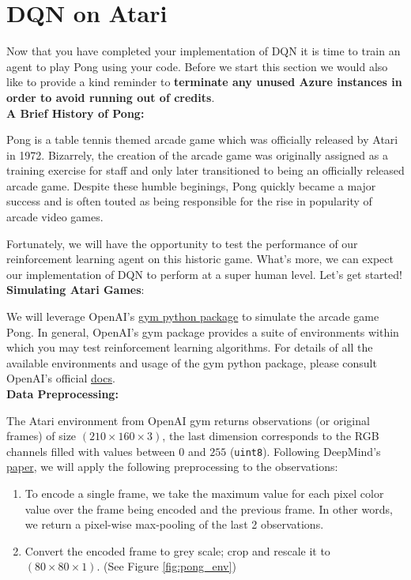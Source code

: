 \section{DQN on Atari}

Now that you have completed your implementation of DQN it is time to train an agent to play Pong using your code. Before we start this section we would also like to provide a kind reminder to \textbf{terminate any unused Azure instances in order to avoid running out of credits}. \\

\textbf{A Brief History of Pong:} 

Pong is a table tennis themed arcade game which was officially released by Atari in 1972. Bizarrely, the creation of the arcade game was originally assigned as a training exercise for staff and only later transitioned to being an officially released arcade game. Despite these humble beginings, Pong quickly became a major success and is often touted as being responsible for the rise in popularity of arcade video games.

Fortunately, we will have the opportunity to test the performance of our reinforcement learning agent on this historic game. What's more, we can expect our implementation of DQN to perform at a super human level. Let's get started! \\

\textbf{Simulating Atari Games}:

We will leverage OpenAI's \href{https://gym.openai.com/}{gym python package} to simulate the arcade game Pong. In general, OpenAI's gym package provides a suite of environments within which you may test reinforcement learning algorithms. For details of all the available environments and usage of the gym python package, please consult OpenAI's official \href{https://gym.openai.com/docs/}{docs}. \\

\textbf{Data Preprocessing:}

The Atari environment from OpenAI gym returns observations (or original frames) of size $ (210 \times 160 \times 3) $, the last dimension corresponds to the RGB channels filled with values between $ 0 $ and $ 255 $ (\texttt{uint8}). Following DeepMind's \href{https://storage.googleapis.com/deepmind-media/dqn/DQNNaturePaper.pdf}{paper}, we will apply the following preprocessing to the observations:   
\begin{enumerate}[1.]
\item To encode a single frame, we take the maximum value for each pixel color value over the frame being encoded and the previous frame. In other words, we return a pixel-wise max-pooling of the last 2 observations.     
\item Convert the encoded frame to grey scale; crop and rescale it to $(80 \times 80 \times 1)$. (See Figure \ref{fig:pong_env})     
\end{enumerate}

